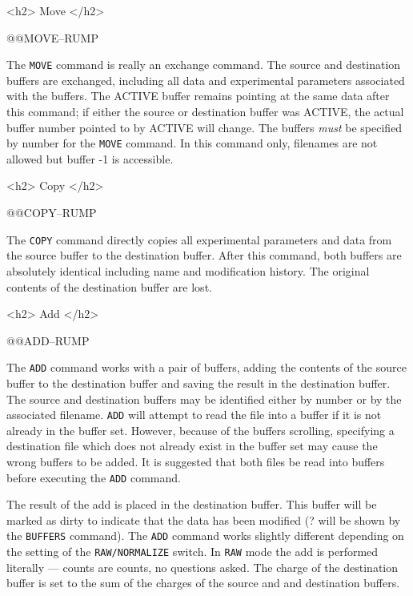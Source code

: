 {{{{{<h2> Move </h2>


@@{MOVE--RUMP}

The {\tt MOVE} command is really an exchange command.  The source and
destination buffers are exchanged, including all data and experimental
parameters associated with the buffers.  The ACTIVE buffer remains pointing at
the same data after this command; if either the source or destination buffer
was ACTIVE, the actual buffer number pointed to by ACTIVE will change.
The buffers {\it must} be specified by number for the {\tt MOVE} command. 
In this command only, filenames are not allowed but buffer -1 is accessible.

<h2> Copy </h2>


@@{COPY--RUMP}

The {\tt COPY} command directly copies all experimental parameters and data
from the source buffer to the destination buffer.  After this command, both
buffers are absolutely identical including name and modification history.  The
original contents of the destination buffer are lost.


<h2> Add </h2>


@@{ADD--RUMP}

The {\tt ADD} command works with a pair of buffers, adding the contents of
the source buffer to the destination buffer and saving the result in the
destination buffer.  The source and destination buffers may be identified
either by number or by the associated filename.  {\tt ADD} will attempt to
read the file into a buffer if it is not already in the buffer set. 
However, because of the buffers scrolling, specifying a destination file
which does not already exist in the buffer set may cause the wrong buffers to
be added.  It is suggested that both files be read into buffers before
executing the {\tt ADD} command.

The result of the add is placed in the destination buffer.  This buffer will
be marked as dirty to indicate that the data has been modified (? will be
shown by the {\tt BUFFERS} command).  The {\tt ADD} command works slightly 
different depending on the setting of the {\tt RAW/NORMALIZE} switch.  In
{\tt RAW} mode the add is performed literally --- counts are counts, no
questions asked.  The charge of the destination buffer is set to the sum of
the charges of the source and and destination buffers. 

}}}}}
